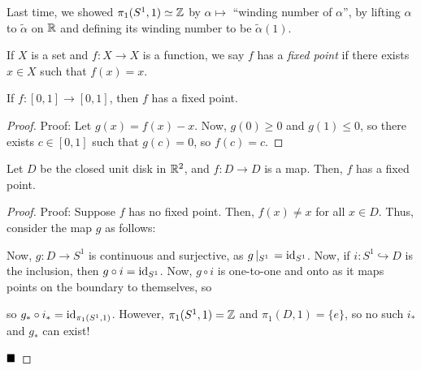 
Last time, we showed $\pi_1(S^1, 1) \simeq \mathbb{Z}$ by $\alpha \mapsto$ ``winding number of $\alpha$'', by lifting $\alpha$ to $\tilde{\alpha}$ on $\mathbb{R}$ and defining its winding number to be $\tilde{\alpha}(1)$.

\begin{definition}
    If $X$ is a set and $f : X \to X$ is a function, we say $f$ has a \emph{fixed point} if there exists $x \in X$ such that $f(x) = x$.
\end{definition}

\begin{lemma}
    If $f : [0, 1] \to [0, 1]$, then $f$ has a fixed point.
\end{lemma}
\begin{proof}{Proof:}
    Let $g(x) = f(x) - x$. Now, $g(0) \geq 0$ and $g(1) \leq 0$, so there exists $c \in [0, 1]$ such that $g(c) = 0$, so $f(c) = c$.
\end{proof}

\begin{theorem}
    Let $D$ be the closed unit disk in $\mathbb{R}^2$, and $f : D \to D$ is a map. Then, $f$ has a fixed point.
\end{theorem}
\begin{proof}{Proof:}
    Suppose $f$ has no fixed point. Then, $f(x) \neq x$ for all $x \in D$. Thus, consider the map $g$ as follows:

    Now, $g : D \to S^1$ is continuous and surjective, as $g\left|_{S^1}\right. = \text{id}_{S^1}$. Now, if $i : S^1 \hookrightarrow D$ is the inclusion, then $g \circ i = \text{id}_{S^1}$. Now, $g \circ i$ is one-to-one and onto as it maps points on the boundary to themselves, so
    \begin{center}
    \end{center}
    so $g_{*} \circ i_{*} = \text{id}_{\pi_1(S^1, 1)}$. However, $\pi_1(S^1, 1) = \mathbb{Z}$ and $\pi_1(D, 1) = \{e\}$, so no such $i_{*}$ and $g_{*}$ can exist!

    $\qed$
\end{proof}


